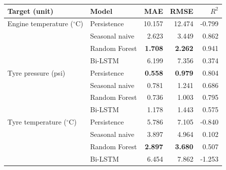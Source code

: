 \begin{tabular}{llrrr}
\toprule
Target (unit) & Model & MAE & RMSE & $R^2$ \\
\midrule
Engine temperature ($^\circ$C) & Persistence & 10.157 & 12.474 & -0.799 \\
 & Seasonal naive & 2.623 & 3.449 & 0.862 \\
 & Random Forest & \textbf{1.708} & \textbf{2.262} & 0.941 \\
 & Bi-LSTM & 6.199 & 7.356 & 0.374 \\
\midrule
Tyre pressure (psi) & Persistence & \textbf{0.558} & \textbf{0.979} & 0.804 \\
 & Seasonal naive & 0.781 & 1.241 & 0.686 \\
 & Random Forest & 0.736 & 1.003 & 0.795 \\
 & Bi-LSTM & 1.178 & 1.443 & 0.575 \\
\midrule
Tyre temperature ($^\circ$C) & Persistence & 5.786 & 7.105 & -0.840 \\
 & Seasonal naive & 3.897 & 4.964 & 0.102 \\
 & Random Forest & \textbf{2.897} & \textbf{3.680} & 0.507 \\
 & Bi-LSTM & 6.454 & 7.862 & -1.253 \\
\bottomrule
\end{tabular}
